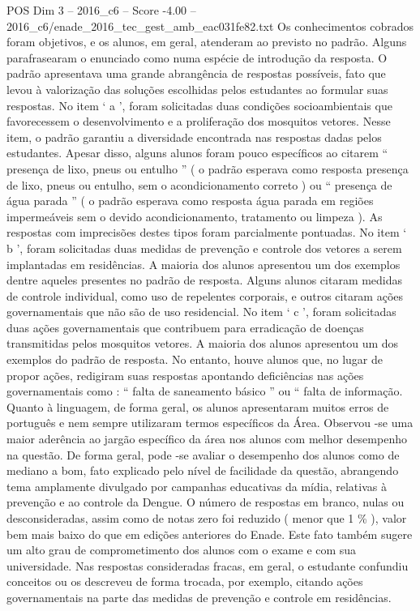\begin{textsample}{POS Dim 3 – 2016\_c6 – Score -4.00 – 2016\_c6/enade\_2016\_tec\_gest\_amb\_eac031fe82.txt}
Os conhecimentos cobrados foram objetivos, e os alunos, em geral, atenderam ao previsto no padrão.
Alguns parafrasearam o enunciado como numa espécie de introdução da resposta.
O padrão apresentava uma grande abrangência de respostas possíveis, fato que levou à valorização das soluções escolhidas pelos estudantes ao formular suas respostas.
No item ‘ a ’, foram solicitadas duas condições socioambientais que favorecessem o desenvolvimento e a proliferação dos mosquitos vetores.
Nesse item, o padrão garantiu a diversidade encontrada nas respostas dadas pelos estudantes.
Apesar disso, alguns alunos foram pouco específicos ao citarem “ presença de lixo, pneus ou entulho ” ( o padrão esperava como resposta presença de lixo, pneus ou entulho, sem o acondicionamento correto ) ou “ presença de água parada ” ( o padrão esperava como resposta água parada em regiões impermeáveis sem o devido acondicionamento, tratamento ou limpeza ).
As respostas com imprecisões destes tipos foram parcialmente pontuadas.
No item ‘ b ’, foram solicitadas duas medidas de prevenção e controle dos vetores a serem implantadas em residências.
A maioria dos alunos apresentou um dos exemplos dentre aqueles presentes no padrão de resposta.
Alguns alunos citaram medidas de controle individual, como uso de repelentes corporais, e outros citaram ações governamentais que não são de uso residencial.
No item ‘ c ’, foram solicitadas duas ações governamentais que contribuem para erradicação de doenças transmitidas pelos mosquitos vetores.
A maioria dos alunos apresentou um dos exemplos do padrão de resposta.
No entanto, houve alunos que, no lugar de propor ações, redigiram suas respostas apontando deficiências nas ações governamentais como : “ falta de saneamento básico ” ou “ falta de informação.
Quanto à linguagem, de forma geral, os alunos apresentaram muitos erros de português e nem sempre utilizaram termos específicos da Área.
Observou -se uma maior aderência ao jargão específico da área nos alunos com melhor desempenho na questão.
De forma geral, pode -se avaliar o desempenho dos alunos como de mediano a bom, fato explicado pelo nível de facilidade da questão, abrangendo tema amplamente divulgado por campanhas educativas da mídia, relativas à prevenção e ao controle da Dengue.
O número de respostas em branco, nulas ou desconsideradas, assim como de notas zero foi reduzido ( menor que 1 \% ), valor bem mais baixo do que em edições anteriores do Enade.
Este fato também sugere um alto grau de comprometimento dos alunos com o exame e com sua universidade.
Nas respostas consideradas fracas, em geral, o estudante confundiu conceitos ou os descreveu de forma trocada, por exemplo, citando ações governamentais na parte das medidas de prevenção e controle em residências.

\end{textsample}
